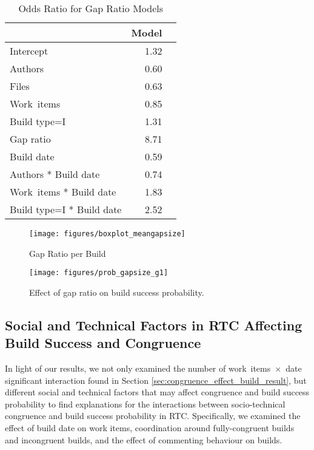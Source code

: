 \begin{table}[t]
\begin{center}
\caption{Odds Ratio for Gap Ratio Models}
\begin{tabular}{lrr}
  \toprule
 & Model\\ 
  \midrule
Intercept & 1.32 \\ 
  Authors &  0.60 \\ 
  Files &  0.63 \\ 
  Work~items  & 0.85 \\ 
  Build type=I  & 1.31 \\ 
  Gap ratio  & 8.71 \\ 
  Build date  & 0.59 \\ 
  Authors * Build date & 0.74 \\ 
  Work~items * Build date  & 1.83 \\ 
  Build type=I * Build date  & 2.52 \\ 
   \bottomrule
\end{tabular}
\label{tab:oddsratio_gapsize}
\end{center}
\end{table}


\begin{figure}[t]
	\centering	
	\texttt{[image: figures/boxplot\_meangapsize]}
	\caption{Gap Ratio per Build}
	\label{fig:gapsizes}
\end{figure}

\begin{figure}[t]
	\centering
	\texttt{[image: figures/prob\_gapsize\_g1]}
	\caption{Effect of gap ratio on build success probability. }
	\label{fig:prob_gapsize_a}
\end{figure}




\subsection{Social and Technical Factors in RTC Affecting Build Success and Congruence}
\label{sec:otherfactors}
In light of our results, we not only examined the number of work~items~$\times$~date significant interaction found in Section \ref{sec:congruence_effect_build_result}, but different social and technical factors that may affect congruence
and build success probability to find explanations for the interactions between socio-technical congruence and build success probability in RTC.
Specifically, we examined the effect of build date on work items, coordination around fully-congruent builds and
incongruent builds, and the effect of commenting behaviour on builds.

